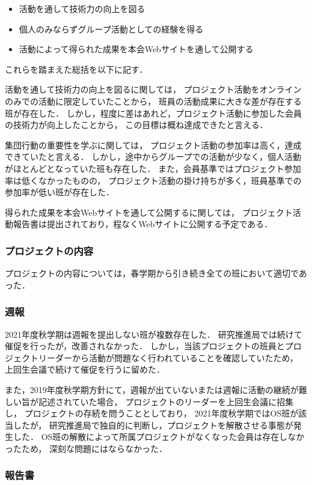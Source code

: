 \begin{itemize}
  \item 活動を通して技術力の向上を図る
  \item 個人のみならずグループ活動としての経験を得る
  \item 活動によって得られた成果を本会Webサイトを通して公開する
\end{itemize}

これらを踏まえた総括を以下に記す．

活動を通して技術力の向上を図るに関しては，
プロジェクト活動をオンラインのみでの活動に限定していたことから，
班員の活動成果に大きな差が存在する班が存在した．
しかし，程度に差はあれど，プロジェクト活動に参加した会員の技術力が向上したことから，
この目標は概ね達成できたと言える．

集団行動の重要性を学ぶに関しては，
プロジェクト活動の参加率は高く，達成できていたと言える．
しかし，途中からグループでの活動が少なく，個人活動がほとんどとなっていた班も存在した．
また，会員基準ではプロジェクト参加率は低くなかったものの，
プロジェクト活動の掛け持ちが多く，班員基準での参加率が低い班が存在した．

得られた成果を本会Webサイトを通して公開するに関しては，
プロジェクト活動報告書は提出されており，程なくWebサイトに公開する予定である．

\subsubsection*{プロジェクトの内容}
プロジェクトの内容については，春学期から引き続き全ての班において適切であった．

\subsubsection*{週報}
2021年度秋学期は週報を提出しない班が複数存在した．
研究推進局では続けて催促を行ったが，改善されなかった．
しかし，当該プロジェクトの班員とプロジェクトリーダーから活動が問題なく行われていることを確認していたため，
上回生会議で続けて催促を行うに留めた．

また，2019年度秋学期方針にて，週報が出ていないまたは週報に活動の継続が難しい旨が記述されていた場合，
プロジェクトのリーダーを上回生会議に招集し，
プロジェクトの存続を問うこととしており，
2021年度秋学期ではOS班が該当したが，
研究推進局で独自的に判断し，プロジェクトを解散させる事態が発生した．
OS班の解散によって所属プロジェクトがなくなった会員は存在しなかったため，
深刻な問題にはならなかった．

\subsubsection*{報告書}

